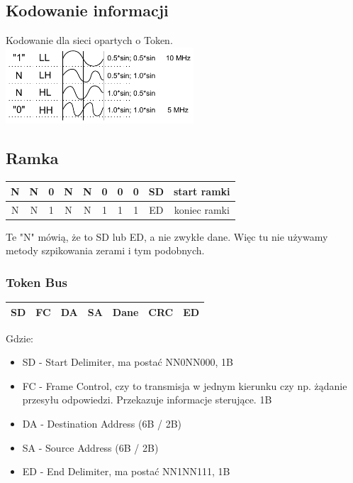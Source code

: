 \documentclass[a4paper,twoside]{article}
\begin{document}
		\subsection{Kodowanie informacji}
			Kodowanie dla sieci opartych o Token.\\
			\includegraphics[width=7cm]{./images/image31.pdf}\\
		\subsection{Ramka}
			\begin{table}[h]
				\begin{tabular}{|c|c|c|c|c|c|c|c|cc}
					\hline
					N & N & 0 & N & N & 0 & 0 & 0 & SD & start ramki \\ \hline
					N & N & 1 & N & N & 1 & 1 & 1 & ED & koniec ramki \\ \hline
				\end{tabular}
			\end{table}
			Te "N" mówią, że to SD lub ED, a nie zwykłe dane. Więc tu nie używamy metody szpikowania zerami i tym podobnych.
			\subsubsection{Token Bus}
				\begin{table}[h]
					\begin{tabular}{|c|c|c|c|c|c|c|}
						\hline
						SD & FC & DA & SA & Dane & CRC & ED \\ \hline
					\end{tabular}
				\end{table}
				Gdzie:
				\begin{itemize}
					\item SD - Start Delimiter, ma postać NN0NN000, 1B
					\item FC - Frame Control, czy to transmisja w jednym kierunku czy np. żądanie przesyłu odpowiedzi. Przekazuje informacje sterujące. 1B
					\item DA - Destination Address (6B / 2B)
					\item SA - Source Address (6B / 2B)
					\item ED - End Delimiter, ma postać NN1NN111, 1B
				\end{itemize}
\end{document}
